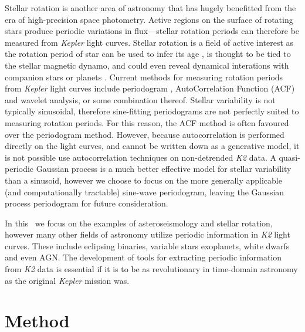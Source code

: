 \documentclass[useAMS, usenatbib, preprint, 12pt]{aastex}
\begin{document}
Stellar rotation is another area of astronomy that has hugely benefitted from
the era of high-precision space photometry.
Active regions on the surface of rotating stars produce periodic variations
in flux---stellar rotation periods can therefore be measured from
{\it Kepler} light curves.
Stellar rotation is a field of active interest as the rotation period of star
can be used to infer its age \citep{Skumanich1972, Barnes2007, Epstein2014},
is thought to be tied to the stellar magnetic dynamo, and could even reveal
dynamical interations with companion stars or planets \citep[e.g.][]{Beky2014,
Poppenhaeger2014}.
Current methods for measuring rotation periods from {\it Kepler} light curves
include periodogram \citep[e.g.][]{Reinhold2013}, AutoCorrelation Function
(ACF) \citep{McQuillan2013} and wavelet \citep[e.g.][]{Garcia2014} analysis,
or some combination thereof.
Stellar variability is not typically sinusoidal, therefore sine-fitting
periodograms are not perfectly suited to measuring rotation periods.
For this reason, the ACF method is often favoured over the periodogram method.
However, because autocorrelation is performed directly on the light curves,
and cannot be written down as a generative model, it is not possible use
autocorrelation techniques on non-detrended {\it K2} data.
A quasi-periodic Gaussian process is a much better effective model for stellar
variability than a sinusoid, however we choose to focus on the more generally
applicable (and computationally tractable) sine-wave periodogram, leaving the
Gaussian process periodogram for future consideration.

In this \article\ we focus on the examples of asteroseismology and stellar
rotation, however many other fields of astronomy utilize periodic information
in {\it K2} light curves.
These include eclipsing binaries, variable stars exoplanets, white dwarfs and
even AGN.
The development of tools for extracting periodic information from {\it K2}
data is essential if it is to be as revolutionary in time-domain
astronomy as the original {\it Kepler} mission was.

\section{Method}
\label{sec:Method}
\end{document}

